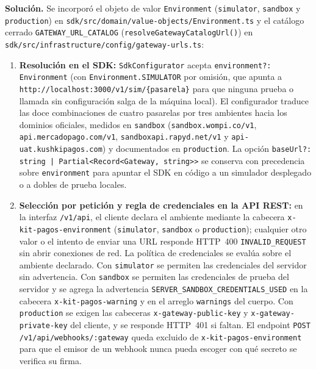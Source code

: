 \textbf{Solución.} Se incorporó el objeto de valor \texttt{Environment} (\texttt{simulator}, \texttt{sandbox} y \texttt{production}) en \texttt{sdk/\allowbreak{}src/\allowbreak{}domain/\allowbreak{}value-\allowbreak{}objects/\allowbreak{}Environment.ts} y el catálogo cerrado \texttt{GATEWAY\_\allowbreak{}URL\_\allowbreak{}CATALOG} (\texttt{resolve\allowbreak{}Gateway\allowbreak{}Catalog\allowbreak{}Url()}) en \texttt{sdk/\allowbreak{}src/\allowbreak{}infrastructure/\allowbreak{}config/\allowbreak{}gateway-\allowbreak{}urls.ts}:
\begin{enumerate}\sloppy
  \item \textbf{Resolución en el SDK:} \texttt{Sdk\allowbreak{}Configurator} acepta \texttt{environment?: Environment} (con \texttt{Environment.SIMULATOR} por omisión, que apunta a \texttt{http://\allowbreak{}localhost:3000/\allowbreak{}v1/\allowbreak{}sim/\allowbreak{}\{pasarela\}} para que ninguna prueba o llamada sin configuración salga de la máquina local). El configurador traduce las doce combinaciones de cuatro pasarelas por tres ambientes hacia los dominios oficiales, medidos en \texttt{sandbox} (\texttt{sandbox.\allowbreak{}wompi.co/\allowbreak{}v1}, \texttt{api.\allowbreak{}mercadopago.com/\allowbreak{}v1}, \texttt{sandboxapi.\allowbreak{}rapyd.net/\allowbreak{}v1} y \texttt{api-\allowbreak{}uat.\allowbreak{}kushkipagos.com}) y documentados en \texttt{production}. La opción \texttt{baseUrl?: string | Partial<\allowbreak{}Record<\allowbreak{}Gateway, string>>} se conserva con precedencia sobre \texttt{environment} para apuntar el SDK en código a un simulador desplegado o a dobles de prueba locales.
  \item \textbf{Selección por petición y regla de credenciales en la API REST:} en la interfaz \texttt{/v1/api}, el cliente declara el ambiente mediante la cabecera \texttt{x-kit-pagos-environment} (\texttt{simulator}, \texttt{sandbox} o \texttt{production}); cualquier otro valor o el intento de enviar una URL responde HTTP~400 \texttt{INVALID\_REQUEST} sin abrir conexiones de red. La política de credenciales se evalúa sobre el ambiente declarado. Con \texttt{simulator} se permiten las credenciales del servidor sin advertencia. Con \texttt{sandbox} se permiten las credenciales de prueba del servidor y se agrega la advertencia \texttt{SERVER\_SANDBOX\_CREDENTIALS\_USED} en la cabecera \texttt{x-kit-pagos-warning} y en el arreglo \texttt{warnings} del cuerpo. Con \texttt{production} se exigen las cabeceras \texttt{x-gateway-public-key} y \texttt{x-gateway-private-key} del cliente, y se responde HTTP~401 si faltan. El endpoint \texttt{POST /v1/api/webhooks/:gateway} queda excluido de \texttt{x-kit-pagos-environment} para que el emisor de un webhook nunca pueda escoger con qué secreto se verifica su firma.
\end{enumerate}

